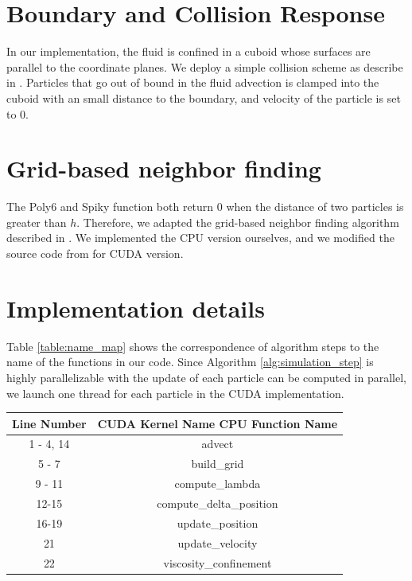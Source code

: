 \documentclass[sigconf]{acmart}
\begin{document}
\section{Boundary and Collision Response}
In our implementation, the fluid is confined in a cuboid whose surfaces are parallel to the coordinate planes. We deploy a simple collision scheme as describe in \cite{pbf-cuda}. Particles that go out of bound in the fluid advection is clamped into the cuboid with an small distance to the boundary, and velocity of the particle is set to 0.

\section{Grid-based neighbor finding}
The Poly6 and Spiky function both return 0 when the distance of two particles is greater than $h$. Therefore, we adapted the grid-based neighbor finding algorithm described in \cite{particle-simulation}. We implemented the CPU version ourselves, and we modified the source code from \cite{particle-source} for CUDA version. 

\section{Implementation details}
Table \ref{table:name_map} shows the correspondence of algorithm steps to the name of the functions in our code. Since Algorithm \ref{alg:simulation_step} is highly parallelizable with the update of each particle can be computed in parallel, we launch one thread for each particle in the CUDA implementation.

\begin{center}
  \begin{tabular}{| c | c |}
    \hline
    Line Number & CUDA Kernel Name\/ CPU Function Name  \\
    \hline
    1 - 4, 14 & advect \\
    \hline
    5 - 7 & build\_grid \\
    \hline
    9 - 11 & compute\_lambda \\
    \hline
    12-15 & compute\_delta\_position \\
    \hline
    16-19 & update\_position \\
    \hline
    21 & update\_velocity \\
    \hline
    22 & viscosity\_confinement \\
    \hline
  \end{tabular}
\end{center}
\end{document}

